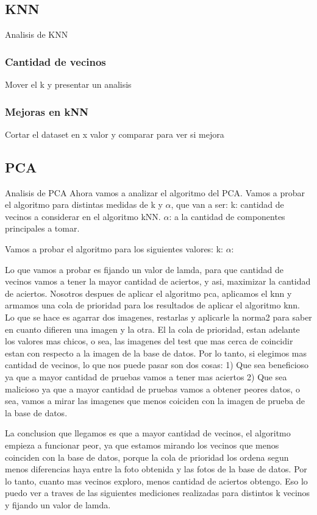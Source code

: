 \subsection{KNN}
Analisis de KNN

\subsubsection{Cantidad de vecinos}
Mover el k y presentar un analisis

\subsubsection{Mejoras en kNN}
Cortar el dataset en x valor y comparar para ver si mejora

\subsection{PCA}
Analisis de PCA
Ahora vamos a analizar el algoritmo del PCA.
Vamos a probar el algoritmo para distintas medidas de k y $\alpha$, que van a ser:
k: cantidad de vecinos a considerar en el algoritmo kNN.
$\alpha$: a la cantidad de componentes principales a tomar.

Vamos a probar el algoritmo para los siguientes valores:
k:
$\alpha$: 

Lo que vamos a probar es fijando un valor de lamda, para que cantidad de vecinos vamos a tener la mayor cantidad de aciertos, y asi, maximizar la cantidad de aciertos.
Nosotros despues de aplicar el algoritmo pca, aplicamos el knn y armamos una cola de prioridad para los resultados de aplicar el algoritmo knn. Lo que se hace es agarrar dos imagenes, restarlas y aplicarle la norma2 para saber en cuanto difieren una imagen y la otra. El la cola de prioridad, estan adelante los valores mas chicos, o sea, las imagenes del test que mas cerca de coincidir estan con respecto a la imagen de la base de datos.
Por lo tanto, si elegimos mas cantidad de vecinos, lo que nos puede pasar son dos cosas:
1) Que sea beneficioso ya que a mayor cantidad de pruebas vamos a tener mas aciertos
2) Que sea malicioso ya que a mayor cantidad de pruebas vamos a obtener peores datos, o sea, vamos a mirar las imagenes que menos coiciden con la imagen de prueba de la base de datos.

La conclusion que llegamos es que a mayor cantidad de vecinos, el algoritmo empieza a funcionar peor, ya que estamos mirando los vecinos que menos coinciden con la base de datos, porque la cola de prioridad los ordena segun menos diferencias haya entre la foto obtenida y las fotos de la base de datos. 
Por lo tanto, cuanto mas vecinos exploro, menos cantidad de aciertos obtengo. Eso lo puedo ver a traves de las siguientes mediciones realizadas para distintos k vecinos y fijando un valor de lamda.

